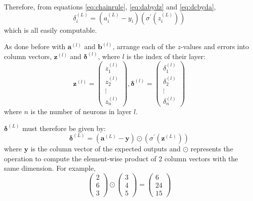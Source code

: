 \documentclass[12pt]{report}
\begin{document}
Therefore, from equations \ref{eq:chainrule}, \ref{eq:dabydz} and \ref{eq:dcbyda},
\begin{equation}
    {\delta}^{\left(L\right)}_i=\left(a^{\left(L\right)}_i-y_i\right)\left({\sigma}^{\prime} \left(z^{\left(L\right)}_i\right)\right)
\end{equation}
which is all easily computable.

As done before with $\mathbf{a}^{\left(l\right)}$ and $\mathbf{b}^{\left(l\right)}$, arrange each of the $z$-values and errors into column vectors, $\mathbf{z}^{\left(l\right)}$ and $\bm{\delta}^{\left(l\right)}$, where $l$ is the index of their layer:
\begin{equation}
    \mathbf{z}^{\left(l\right)}=\begin{pmatrix}z^{\left(l\right)}_1\\[0.3em]z^{\left(l\right)}_2\\\vdots \\z^{\left(l\right)}_n\end{pmatrix},\bm{\delta}^{\left(l\right)}=\begin{pmatrix}{\delta}^{\left(l\right)}_1\\[0.3em]{\delta}^{\left(l\right)}_2\\\vdots \\{\delta}^{\left(l\right)}_n\end{pmatrix}
\end{equation}
where $n$ is the number of neurons in layer $l$.

$\bm{\delta}^{\left(L\right)}$ must therefore be given by:
\begin{equation}
    \bm{\delta}^{\left(L\right)}=\left(\mathbf{a}^{\left(L\right)}-\mathbf{y}\right)\odot \left({\sigma}^{\prime} \left(\mathbf{z}^{\left(L\right)}\right)\right)
\end{equation}
where $\mathbf{y}$ is the column vector of the expected outputs and $\odot$ represents the operation to compute the element-wise product of 2 column vectors with the same dimension. For example,
\begin{equation}
    \begin{pmatrix}2\\6\\3\end{pmatrix}\odot \begin{pmatrix}3\\4\\5\end{pmatrix}=\begin{pmatrix}6\\24\\15\end{pmatrix}
\end{equation}
\end{document}
